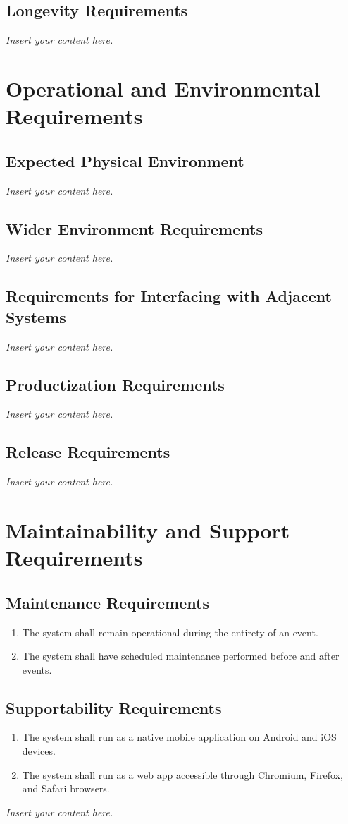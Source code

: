 \documentclass[12pt]{article}
\newcommand{\lips}{\textit{Insert your content here.}}
\begin{document}
\subsection{Longevity Requirements}
\lips

\section{Operational and Environmental Requirements}
\subsection{Expected Physical Environment}
\lips
\subsection{Wider Environment Requirements}
\lips
\subsection{Requirements for Interfacing with Adjacent Systems}
\lips
\subsection{Productization Requirements}
\lips
\subsection{Release Requirements}
\lips

\section{Maintainability and Support Requirements}
\subsection{Maintenance Requirements}
\begin{enumerate}[align=left,
  leftmargin=*,
  labelsep=1em,
  itemindent=0em,
  label=\bfseries MT-\arabic*:]
  \item The system shall remain operational during the entirety of an event.
  \item The system shall have scheduled maintenance performed before and after events.
\end{enumerate}
\subsection{Supportability Requirements}
\begin{enumerate}[align=left,
  leftmargin=*,
  labelsep=1em,
  itemindent=0em,
  label=\bfseries SU-\arabic*:]
  \item The system shall run as a native mobile application on Android and iOS devices.
  \item The system shall run as a web app accessible through Chromium, Firefox, and
    Safari browsers.
\end{enumerate}
\lips
\end{document}
